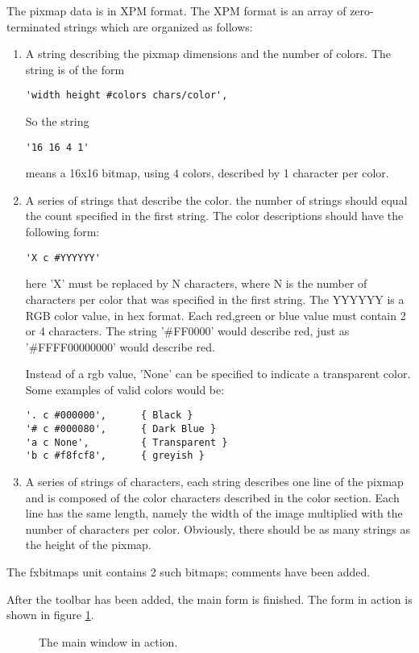 \documentclass[10pt]{article}
\newcommand{\file}[1]{\textsf{#1}}
\begin{document}
The pixmap data is in XPM format. The XPM format is an array of
zero-terminated strings which are organized as follows:
\begin{enumerate}
\item A string describing the pixmap dimensions and the number of colors.
The string is of the form 
\begin{verbatim}
'width height #colors chars/color',
\end{verbatim}
So the string
\begin{verbatim}
'16 16 4 1'
\end{verbatim}
means a 16x16 bitmap, using 4 colors, described by 1 character per color.
\item A series of strings that describe the color. the number of strings
should equal the count specified in the first string. The color descriptions
should have the following form:
\begin{verbatim}
'X c #YYYYYY'
\end{verbatim}
here 'X' must be replaced by N characters, where N is the number of
characters per color that was specified in the first string. The YYYYYY
is a RGB color value, in hex format. Each red,green or blue value must
contain 2 or 4 characters. The string '\#FF0000' would describe red, just as
'\#FFFF00000000' would describe red.

Instead of a rgb value, 'None' can be specified to indicate a transparent
color.
Some examples of valid colors would be:
\begin{verbatim}
'. c #000000',      { Black }
'# c #000080',      { Dark Blue }
'a c None',         { Transparent }
'b c #f8fcf8',      { greyish }
\end{verbatim}
\item A series of strings of characters, each string describes one line of
the pixmap and is composed of the color characters described in the color
section. Each line has the same length, namely the width of the image
multiplied with the number of characters per color. Obviously, there 
should be as many strings as the height of the pixmap.
\end{enumerate}
The \file{fxbitmaps} unit contains 2 such bitmaps; comments have been added.

After the toolbar has been added, the main form is finished. The 
form in action is shown in figure \ref{fig:mainwin}.
\begin{figure}[ht]
\caption{The main window in action.}\label{fig:mainwin}
\end{figure}
\end{document}
